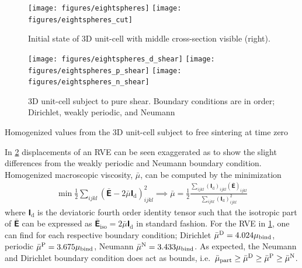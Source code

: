 \documentclass[12pt,a4paper]{article}
\renewcommand{\tf}[1]{\mathbfsfup{#1}}
\renewcommand{\dev}{\mathrm{d}}
\newcommand{\Periodic}{\mathrm{P}}
\newcommand{\particle}{\mathrm{part}}
\begin{document}
\begin{figure}[H]
 \centering
 \texttt{[image: figures/eightspheres]}
 \texttt{[image: figures/eightspheres\_cut]}
 \caption{Initial state of 3D unit-cell with middle cross-section visible (right).}
 \label{fig:rve_3d}
\end{figure}


\begin{figure}[H]
 \centering
 \texttt{[image: figures/eightspheres\_d\_shear]}
 \texttt{[image: figures/eightspheres\_p\_shear]}
 \texttt{[image: figures/eightspheres\_n\_shear]}
 \caption{3D unit-cell subject to pure shear. Boundary conditions are in order; Dirichlet, weakly periodic, and Neumann}
 \label{fig:rve_3d_deformed}
\end{figure}

\begin{table}[H]
 \centering



 \caption{Homogenized values from the 3D unit-cell subject to free sintering at time zero}
 \label{tab:rve_3d_homog}
\end{table}



In \cref{fig:rve_3d_deformed} displacements of an RVE can be seen exaggerated as to show the slight differences from the weakly periodic and Neumann boundary condition.
Homogenized macroscopic viscosity, $\bar{\mu}$, can be computed by the minimization
\begin{align}
 \min \frac12 \sum_{ijkl} (\bar{\tf E} - 2 \bar{\mu} \tf I_\dev)_{ijkl}^2 \implies \bar{\mu} = \frac12 \frac{\sum_{ijkl}(\tf I_\dev)_{ijkl}(\bar{\tf E})_{ijkl}}{\sum_{ijkl} (\tf I_\dev)_{ijkl}^2}
\end{align}
where $\tf I_\dev$ is the deviatoric fourth order identity tensor such that the isotropic part of $\bar{\tf E}$ can be expressed as $\bar{\tf E}_{\mathrm{iso}} = 2 \bar{\mu} \tf I_\dev$ in standard fashion.
For the RVE in \cref{fig:rve_3d}, one can find for each respective boundary condition; Dirichlet $\bar{\mu}^{\mathrm{D}} = 4.024 \mu_{\mathrm{bind}}$, periodic $\bar{\mu}^\Periodic = 3.675\mu_\binder$, Neumann $\bar{\mu}^{\mathrm{N}} = 3.433\mu_{\mathrm{bind}}$.
As expected, the Neumann and Dirichlet boundary condition does act as bounds, i.e.\ $\bar{\mu}_\particle \geq \bar{\mu}^\Dirichlet \geq \bar{\mu}^\Periodic \geq \bar{\mu}^\Neumann$.
\end{document}
